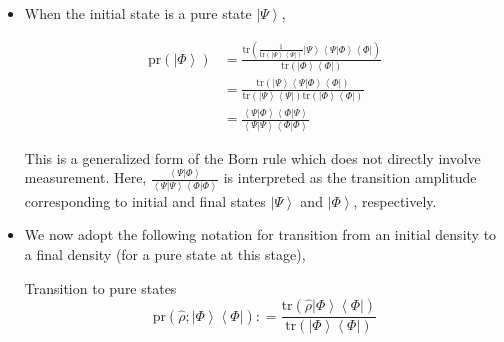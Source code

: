 \documentclass[9pt,handout]{beamer}
\newcommand{\pr}[0]{\text{pr}}
\newcommand{\tr}[0]{\text{tr}}
\begin{document}
\begin{frame}{}
\begin{itemize}
\item When the initial state is a pure state $\left\lvert \Psi \right\rangle$,

\begin{align*}
\pr \left( \left\lvert \Phi \right\rangle \right) & = \frac{\tr \left( \frac{1}{\tr \left( \left\lvert \Psi \right\rangle \left\langle \Psi \right\rvert \right)} \left\lvert \Psi \right\rangle \left\langle \Psi \right\rvert \left. \Phi \right\rangle \left\langle \Phi \right\rvert \right)}{\tr \left( \left\lvert \Phi \right\rangle \left\langle \Phi \right\rvert \right)} \\
& = \frac{\tr \left( \left\lvert \Psi \right\rangle \left\langle \Psi \right\rvert \left. \Phi \right\rangle \left\langle \Phi \right\rvert \right)}{\tr \left( \left\lvert \Psi \right\rangle \left\langle \Psi \right\rvert \right) \tr \left( \left\lvert \Phi \right\rangle \left\langle \Phi \right\rvert \right)} \\
& = \frac{\left\langle \Psi \right\rvert \left. \Phi \right\rangle \left\langle \Phi \right\rvert \left. \Psi \right\rangle}{\left\langle \Psi \right\rvert \left. \Psi \right\rangle \left\langle \Phi \right\rvert \left. \Phi \right\rangle}
\end{align*}

This is a generalized form of the Born rule which does not directly involve measurement. Here, $\displaystyle{\frac{\left\langle \Psi \right\rvert \left. \Phi \right\rangle}{\left\langle \Psi \right\rvert \left. \Psi \right\rangle \left\langle \Phi \right\rvert \left. \Phi \right\rangle}}$ is interpreted as the transition amplitude corresponding to initial and final states $\left\lvert \Psi \right\rangle$ and $\left\lvert \Phi \right\rangle$, respectively.

\item We now adopt the following notation for transition from an initial density to a final density (for a pure state at this stage),

\begin{block}{Transition to pure states}
$$\pr \left( \widehat{\rho}; \left\lvert \Phi \right\rangle \left\langle \Phi \right\rvert \right) : = \frac{\tr \left( \widehat{\rho} \left\lvert \Phi \right\rangle \left\langle \Phi \right\rvert \right)}{\tr \left( \left\lvert \Phi \right\rangle \left\langle \Phi \right\rvert \right)}$$
\end{block}
\end{itemize}
\end{frame}
\end{document}
